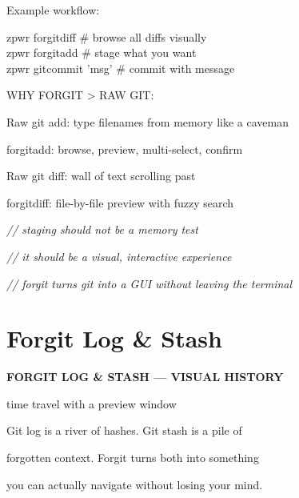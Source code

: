 \documentclass[11pt,a4paper,twoside]{book}
\begin{document}
Example workflow:

\begin{codebox}
zpwr forgitdiff           \# browse all diffs visually\\
zpwr forgitadd            \# stage what you want\\
zpwr gitcommit 'msg'      \# commit with message\\
\end{codebox}

WHY FORGIT > RAW GIT:

\begin{codebox}
Raw git add:     type filenames from memory like a caveman\\
\end{codebox}

forgitadd:       browse, preview, multi-select, confirm

\begin{codebox}
Raw git diff:    wall of text scrolling past\\
\end{codebox}

forgitdiff:      file-by-file preview with fuzzy search

{\small\itshape\color{dimtext} // staging should not be a memory test}

{\small\itshape\color{dimtext} // it should be a visual, interactive experience}

{\small\itshape\color{dimtext} // forgit turns git into a GUI without leaving the terminal}


\vspace{16pt}

\section{Forgit Log \& Stash}


\vspace{10pt}
{\large\bfseries\color{neoncyan} FORGIT LOG \& STASH — VISUAL HISTORY}\vspace{6pt}

time travel with a preview window

Git log is a river of hashes. Git stash is a pile of

\begin{codebox}
forgotten context. Forgit turns both into something\\
\end{codebox}

you can actually navigate without losing your mind.
\end{document}
